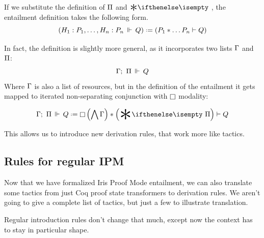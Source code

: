 If we substitute the definition of \(\Pi\) and \(\Sep\), the entailment definition takes the following form.
\[\left( \entailsOne {H_1 : P_1, \ldots , H_n : P_n} Q \right) \defeq
  \left( P_1 * \ldots P_n \vdash Q \right)\]

In fact, the definition is slightly more general, as it incorporates two lists \(\Gamma\) and \(\Pi\):
\[\Gamma ;\,\, \Pi \,\Vdash\, Q\]
Where \(\Gamma\) is also a list of resources, but in the definition of the entailment it gets mapped to iterated non-separating conjunction with \(\mathop{\Box}\) modality:

 \[\entailsD Q \defeq \intuit \left(\bigwedge \IntuD\right) * \left(\Sep \SpatD\right) \vdash Q\]

This allows us to introduce new derivation rules, that work more like tactics.

\subsection{Rules for regular IPM}
\label{sec:rules-regular-ipm}

Now that we have formalized Iris Proof Mode entailment, we can also translate some tactics from just Coq proof state transformers to derivation rules.
We aren't going to give a complete list of tactics, but just a few to illustrate translation.

Regular introduction rules don't change that much, except now the context has to stay in particular shape.

